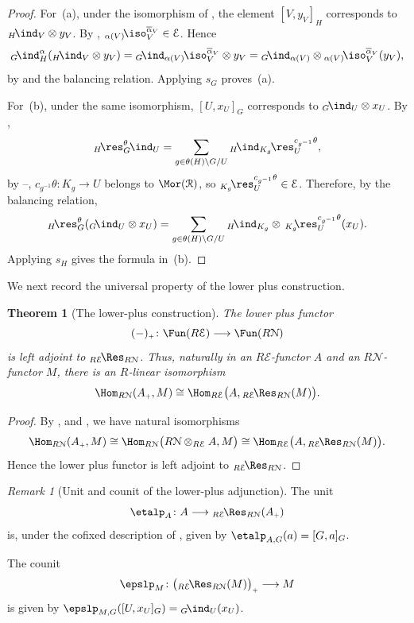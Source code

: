 \documentclass{amsart}
\numberwithin{equation}{section}%
\newtheorem{Thm}[equation]{Theorem}
\theoremstyle{remark}
\newtheorem{Rem}[equation]{Remark}
\theoremstyle{definition}
\newcommand{\e}{\mathcal E}
\newcommand{\n}{\mathcal N}
\newcommand{\lind}[1]{{}_{#1}\!\ind}
\newcommand{\lres}[1]{{}_{#1}\!\res}
\newcommand{\liso}[1]{{}_{#1}\!\iso}
\newcommand{\iRes}[2]{{}_{#1}\!\Res_{#2}}
\newcommand{\ol}[1]{\overline{#1}}
\begin{document}
%
\begin{proof}
For~(a), under the isomorphism of
, the element $[V,y_V]_H$
corresponds to $\lind{H}_V\otimes y_V$. By ,
$\liso{\alpha(V)}_V^{\ol{\alpha}_V}\in\e$.
Hence
%
\[
\lind{G}_H^\alpha
(\lind{H}_V\otimes y_V)
=
\lind{G}_{\alpha(V)}
\liso{}_V^{\ol{\alpha}_V}
\otimes y_V
=
\lind{G}_{\alpha(V)}
\otimes
\liso{\alpha(V)}_V^{\ol{\alpha}_V}(y_V),
\]
%
by  and the balancing relation.
Applying $s_G$ proves~(a).

For~(b), under the same isomorphism,
$[U,x_U]_G$ corresponds to $\lind{G}_U\otimes x_U$.
By ,
%
\[
\lres{H}_G^\theta\lind{}_U
=
\sum_{g\in\theta(H)\backslash G/U}
{}\lind{H}_{K_g}
\lres{}_U^{c_{g^{-1}}\theta},
\]
%
by --,
$c_{g^{-1}}\theta\colon K_g\to U$
belongs to $\Mor(\mathcal R)$, so
$\lres{K_g}_U^{c_{g^{-1}}\theta}\in\e$.
Therefore, by the balancing relation,
%
\[
\lres{H}_G^\theta
(\lind{G}_U\otimes x_U)
=
\sum_{g\in\theta(H)\backslash G/U}
\lind{H}_{K_g}\otimes
\,{\lres{K_g\!}_U^{c_{g^{-1}}\theta}(x_U)}.
\]
%
Applying $s_H$ gives the formula in~(b).
\end{proof}
%
We next record the universal property of the lower plus construction.
%
\begin{Thm}[The lower-plus construction]
\label{thm:lower-plus-adjunction}
The lower plus functor
%
\[
(-)_{\scriptscriptstyle+}
\colon
\Fun(R\e)
\longrightarrow
\Fun(R\n)
\]
%
is left adjoint to
$\iRes{R\e}{R\n}$.
Thus, naturally in an $R\e$-functor $A$ and an
$R\n$-functor $M$, there is an $R$-linear isomorphism
\[
\Hom_{R\n}(\Alp,M)
\cong
\Hom_{R\e}
\bigl(
A,\iRes{R\e}{R\n}(M)
\bigr).
\]
\end{Thm}
\begin{proof}
By ,
 and
,
we have natural isomorphisms
%
\[
\Hom_{R\n}(\Alp,M)
\cong
\Hom_{R\n}
\bigl(
R\n\otimes_{R\e}A,M
\bigr)
\cong
\Hom_{R\e}
\bigl(
A,\iRes{R\e}{R\n}(M)
\bigr).
\]
%
Hence the lower plus functor is left adjoint to
$\iRes{R\e}{R\n}$.
\end{proof}
%
\begin{Rem}[Unit and counit of the lower-plus adjunction]
\label{rem:lower-plus-unit-counit}
The unit
\[
\etalp_A
\colon
A\longrightarrow
\iRes{R\e}{R\n}(\Alp)
\]
is, under the cofixed description of
, given by
$\etalp_{A,G}(a)=[G,a]_G$.

The counit
\[
\epslp_M
\colon
\bigl(
\iRes{R\e}{R\n}(M)
\bigr)_{\scriptscriptstyle+}
\longrightarrow
M
\]
is given by
$\epslp_{M,G}([U,x_U]_G)=\lind{G}_U(x_U)$.
\end{Rem}
\end{document}

